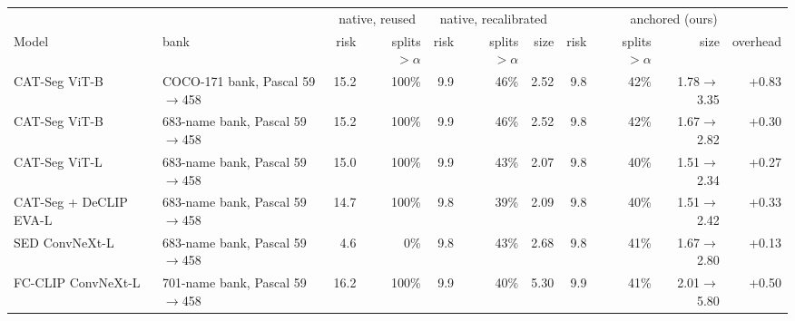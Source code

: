 \begin{tabular}{@{}llrrrrrrrrr@{}}
\toprule
& & \multicolumn{2}{c}{native, reused} & \multicolumn{3}{c}{native, recalibrated} & \multicolumn{4}{c}{anchored (ours)} \\
\cmidrule(lr){3-4}\cmidrule(lr){5-7}\cmidrule(lr){8-11}
Model & bank & risk & splits $>\alpha$ & risk & splits $>\alpha$ & size & risk & splits $>\alpha$ & size & overhead \\
\midrule
CAT-Seg ViT-B & COCO-171 bank, Pascal 59$\to$458 & 15.2 & 100\% & 9.9 & 46\% & 2.52 & 9.8 & 42\% & 1.78$\to$3.35 & +0.83 \\
CAT-Seg ViT-B & 683-name bank, Pascal 59$\to$458 & 15.2 & 100\% & 9.9 & 46\% & 2.52 & 9.8 & 42\% & 1.67$\to$2.82 & +0.30 \\
CAT-Seg ViT-L & 683-name bank, Pascal 59$\to$458 & 15.0 & 100\% & 9.9 & 43\% & 2.07 & 9.8 & 40\% & 1.51$\to$2.34 & +0.27 \\
CAT-Seg + DeCLIP EVA-L & 683-name bank, Pascal 59$\to$458 & 14.7 & 100\% & 9.8 & 39\% & 2.09 & 9.8 & 40\% & 1.51$\to$2.42 & +0.33 \\
SED ConvNeXt-L & 683-name bank, Pascal 59$\to$458 & 4.6 & 0\% & 9.8 & 43\% & 2.68 & 9.8 & 41\% & 1.67$\to$2.80 & +0.13 \\
FC-CLIP ConvNeXt-L & 701-name bank, Pascal 59$\to$458 & 16.2 & 100\% & 9.9 & 40\% & 5.30 & 9.9 & 41\% & 2.01$\to$5.80 & +0.50 \\
\bottomrule
\end{tabular}
